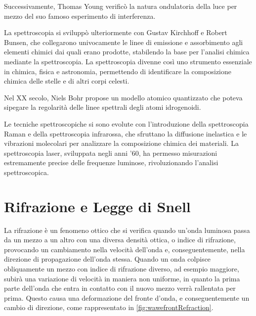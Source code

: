 \documentclass[12pt,a4paper]{report}
\begin{document}
Successivamente, Thomas Young verificò la natura ondulatoria della luce per mezzo del suo famoso esperimento di interferenza\cite{Young1804}.

La spettroscopia si sviluppò ulteriormente con Gustav Kirchhoff e Robert Bunsen, che collegarono univocamente le linee di emissione e assorbimento agli elementi chimici dai quali erano prodotte\cite{Kirchhoff1861}, stabilendo la base per l'analisi chimica mediante la spettroscopia. La spettroscopia divenne così uno strumento essenziale in chimica, fisica e astronomia, permettendo di identificare la composizione chimica delle stelle e di altri corpi celesti.

Nel XX secolo, Niels Bohr propose un modello atomico quantizzato che poteva sipegare la regolarità delle linee spettrali degli atomi idrogenoidi\cite{Bohr1913}.

Le tecniche spettroscopiche si sono evolute con l'introduzione della spettroscopia Raman e della spettroscopia infrarossa, che sfruttano la diffusione inelastica e le vibrazioni molecolari per analizzare la composizione chimica dei materiali. La spettroscopia laser, sviluppata negli anni '60, ha permesso misurazioni estremamente precise delle frequenze luminose, rivoluzionando l'analisi spettroscopica.

\section{Rifrazione e Legge di Snell}

La rifrazione è un fenomeno ottico che si verifica quando un'onda luminosa passa da un mezzo a un altro con una diversa densità ottica, o indice di rifrazione, provocando un cambiamento nella velocità dell'onda e, conseguentemente, nella direzione di propagazione dell'onda stessa. Quando un onda colpisce obliquamente un mezzo con indice di rifrazione diverso, ad esempio maggiore, subirà una variazione di velocità in maniera non uniforme, in quanto la prima parte dell'onda che entra in contatto con il nuovo mezzo verrà rallentata per prima. Questo causa una deformazione del fronte d'onda, e conseguentemente un cambio di direzione, come rappresentato in \cref{fig:wawefrontRefraction}.
\end{document}
